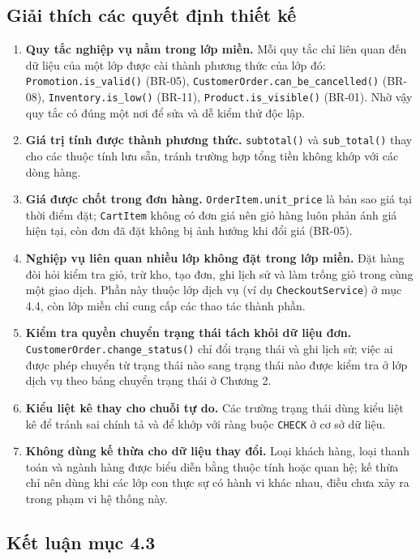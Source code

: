 \documentclass[12pt,a4paper,oneside]{report}
\begin{document}
\subsection{Giải thích các quyết định thiết kế}

\begin{enumerate}
  \item \textbf{Quy tắc nghiệp vụ nằm trong lớp miền.} Mỗi quy tắc chỉ liên quan đến dữ liệu của một lớp được cài thành phương thức của lớp đó: \texttt{Promotion.is\_valid()} (BR-05), \texttt{CustomerOrder.can\_be\_cancelled()} (BR-08), \texttt{Inventory.is\_low()} (BR-11), \texttt{Product.is\_visible()} (BR-01). Nhờ vậy quy tắc có đúng một nơi để sửa và dễ kiểm thử độc lập.
  \item \textbf{Giá trị tính được thành phương thức.} \texttt{subtotal()} và \texttt{sub\_total()} thay cho các thuộc tính lưu sẵn, tránh trường hợp tổng tiền không khớp với các dòng hàng.
  \item \textbf{Giá được chốt trong đơn hàng.} \texttt{OrderItem.unit\_price} là bản sao giá tại thời điểm đặt; \texttt{CartItem} không có đơn giá nên giỏ hàng luôn phản ánh giá hiện tại, còn đơn đã đặt không bị ảnh hưởng khi đổi giá (BR-05).
  \item \textbf{Nghiệp vụ liên quan nhiều lớp không đặt trong lớp miền.} Đặt hàng đòi hỏi kiểm tra giỏ, trừ kho, tạo đơn, ghi lịch sử và làm trống giỏ trong cùng một giao dịch. Phần này thuộc lớp dịch vụ (ví dụ \texttt{CheckoutService}) ở mục 4.4, còn lớp miền chỉ cung cấp các thao tác thành phần.
  \item \textbf{Kiểm tra quyền chuyển trạng thái tách khỏi dữ liệu đơn.} \texttt{CustomerOrder.change\_status()} chỉ đổi trạng thái và ghi lịch sử; việc ai được phép chuyển từ trạng thái nào sang trạng thái nào được kiểm tra ở lớp dịch vụ theo bảng chuyển trạng thái ở Chương 2.
  \item \textbf{Kiểu liệt kê thay cho chuỗi tự do.} Các trường trạng thái dùng kiểu liệt kê để tránh sai chính tả và để khớp với ràng buộc \texttt{CHECK} ở cơ sở dữ liệu.
  \item \textbf{Không dùng kế thừa cho dữ liệu thay đổi.} Loại khách hàng, loại thanh toán và ngành hàng được biểu diễn bằng thuộc tính hoặc quan hệ; kế thừa chỉ nên dùng khi các lớp con thực sự có hành vi khác nhau, điều chưa xảy ra trong phạm vi hệ thống này.
\end{enumerate}

\subsection{Kết luận mục 4.3}
\end{document}
